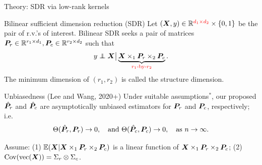 \documentclass[compress,dvipsnames]{beamer}
\newcommand{\ind}{\perp\!\!\!\!\perp}
\begin{document}
\begin{frame}{Theory: SDR via low-rank kernels}
\begin{block}{Bilinear sufficient dimension reduction (SDR)}
Let $(\bm{X},y)\in\mathbb{R}^{{\color{red}d_1\times d_2}}\times \{0,1\}$ be the pair of r.v.'s of interest.  Bilinear SDR seeks a pair of matrices $\bm{P}_r\in\mathbb{R}^{r_1\times d_1}, \bm{P}_c\in\mathbb{R}^{r_2\times d_2}$ such that
\[
y\ind \mX \big|\KeepStyleUnderBrace{\mX\times_1\mP_r\times_2\mP_c}_{\text{\color{red}$r_1$-by-$r_2$}}.
\]
The minimum dimension of $(r_1,r_2)$ is called the structure dimension. 
\end{block} 

\begin{block}{Unbiasedness (Lee and Wang, 2020+)}
Under suitable assumptions$^*$, our proposed $\hat {\bm{P}}_r$ and $\hat {\bm{P}}_c$ are asymptotically unbiased estimators for $\bm{P}_r$ and $\bm{P}_c$, respectively; i.e.
\[
\Theta(\hat {\bm{P}}_r,\bm{P}_r)\rightarrow 0, \quad \text{and}\ \Theta(\hat {\bm{P}}_c,\bm{P}_c)\rightarrow 0,\quad \text{as }n\to \infty.
\]
\end{block}

{\scriptsize Assume: (1) $\mathbb{E}(\bm{X}|\bm{X}\times_1\bm{P}_r\times_2\bm{P}_c)$ is a linear function of $\bm{X}\times_1\bm{P}_r\times_2\bm{P}_c$; (2) $\text{Cov}(\text{vec}(\bm{X}))=\Sigma_r\otimes \Sigma_c$}.
\end{frame}
\end{document}
